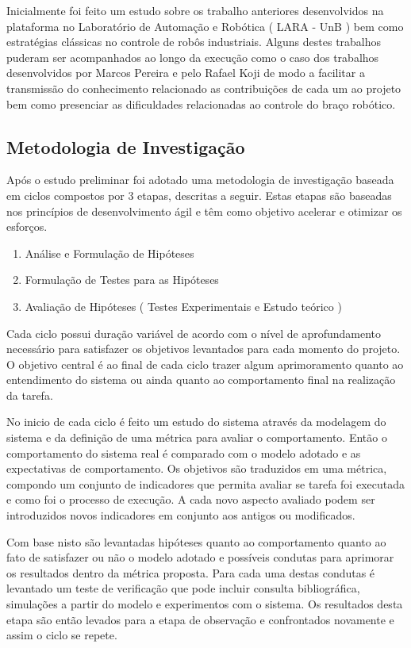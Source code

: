 Inicialmente foi feito um estudo sobre os trabalho anteriores desenvolvidos na plataforma no Laboratório de Automação e Robótica ( LARA - UnB ) bem como estratégias clássicas no controle de robôs industriais. Alguns destes trabalhos puderam ser acompanhados ao longo da execução como o caso dos trabalhos desenvolvidos por Marcos Pereira e pelo Rafael Koji de modo a facilitar a transmissão do conhecimento relacionado as contribuições de cada um ao projeto bem como presenciar as dificuldades relacionadas ao controle do braço robótico.

\subsection{Metodologia de Investigação}

Após o estudo preliminar foi adotado uma metodologia de investigação baseada em ciclos compostos por 3 etapas, descritas a seguir. Estas etapas são baseadas nos princípios de desenvolvimento ágil e têm como objetivo acelerar e otimizar os esforços.

\begin{enumerate}
    \item Análise e Formulação de Hipóteses
    \item Formulação de Testes para as Hipóteses
    \item Avaliação de Hipóteses ( Testes Experimentais e Estudo teórico )
\end{enumerate}

Cada ciclo possui duração variável de acordo com o nível de aprofundamento necessário para satisfazer os objetivos levantados para cada momento do projeto. O objetivo central é ao final de cada ciclo trazer algum aprimoramento quanto ao entendimento do sistema ou ainda quanto ao comportamento final na realização da tarefa.

No inicio de cada ciclo é feito um estudo do sistema através da modelagem do sistema e da definição de uma métrica para avaliar o comportamento. Então o comportamento do sistema real é comparado com o modelo adotado e as expectativas de comportamento. Os objetivos são traduzidos em uma métrica, compondo um conjunto de indicadores que permita avaliar se tarefa foi executada e como foi o processo de execução. A cada novo aspecto avaliado podem ser introduzidos novos indicadores em conjunto aos antigos ou modificados. 

Com base nisto são levantadas hipóteses quanto ao comportamento quanto ao fato de satisfazer ou não o modelo adotado e possíveis condutas para aprimorar os resultados dentro da métrica proposta. Para cada uma destas condutas é levantado um teste de verificação que pode incluir consulta bibliográfica, simulações a partir do modelo e experimentos com o sistema. Os resultados desta etapa são então levados para a etapa de observação e confrontados novamente e assim o ciclo se repete.

